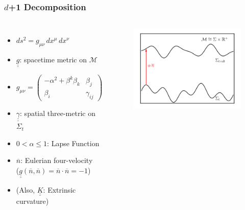 \documentclass{beamer}
\newcommand{\ul}{\underline}
\newcommand{\ol}{\overline}
\begin{document}
\begin{frame}
\frametitle{$d$+1 Decomposition}

  \begin{columns}[c]


      \begin{itemize}[<+->]
        \item[]
          $ds^{2}=g_{\mu\nu}\,dx^{\mu}\,dx^{\nu}$\\[1em]
        \item[]
          $\ul{\ul{g}}$: spacetime metric on $\mathcal{M}$\\[1em]
        \item[]
          $g_{\mu\nu}
            =\begin{pmatrix}
             -\alpha^{2}+\beta^{k}\beta_{k} & \beta_{j} \\[1em]
             \beta_{i}   & \gamma_{ij}
             \end{pmatrix}$\\[1em]
        \item[]
          $\ul{\ul{\gamma}}$: spatial three-metric on $\Sigma_{t}$\\[1em]
        \item[]
          $0<\alpha\leq1$: Lapse Function\\[1em]
        \item[]
          $\ol{n}$: Eulerian four-velocity\\[1em]
          ($\ul{\ul{g}}\left(\ol{n},\ol{n}\right)=\ol{n}\cdot\ol{n}=-1$)\\[1em]
        \item[]
          (Also, $\ul{\ul{K}}$: Extrinsic curvature)
      \end{itemize}


      \begin{figure}[htb!]
        \centering
        \includegraphics[width=\textwidth]{fig.1+1a.png}
      \end{figure}

  \end{columns}

\end{frame}
\end{document}
